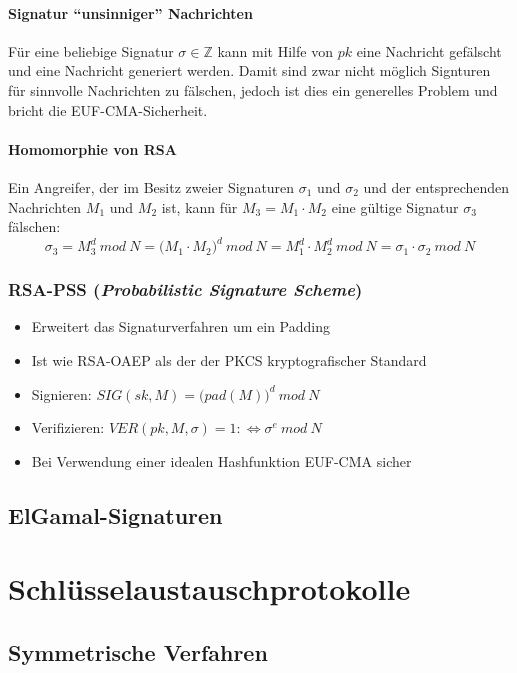 \paragraph{Signatur "`unsinniger"' Nachrichten}
Für eine beliebige Signatur \(\sigma \in \mathbb{Z}\) kann mit Hilfe von \(pk\) eine Nachricht gefälscht und eine Nachricht generiert werden. Damit sind zwar nicht möglich Signturen für sinnvolle Nachrichten zu fälschen, jedoch ist dies ein generelles Problem und bricht die EUF-CMA-Sicherheit.

\paragraph{Homomorphie von RSA}
Ein Angreifer, der im Besitz zweier Signaturen \(\sigma_1\) und \(\sigma_2\) und der entsprechenden Nachrichten \(M_1\) und \(M_2\) ist, kann für \(M_3 = M_1 \cdot M_2\) eine gültige Signatur \(\sigma_3\) fälschen:
\[\sigma_3 = M^d_3~mod~N = \big(M_1 \cdot M_2\big)^d~mod~N = M_1^d \cdot M_2^d~mod~N = \sigma_1 \cdot \sigma_2~mod~N\]

\subsubsection{RSA-PSS (\textit{Probabilistic Signature Scheme})}
\begin{itemize}
	\item Erweitert das Signaturverfahren um ein Padding
	\item Ist wie RSA-OAEP als der der PKCS kryptografischer Standard
	\item Signieren: \(SIG(sk,M) = \big(pad(M)\big)^d~mod~N\)
	\item Verifizieren: \(VER(pk,M,\sigma)=1 :\Leftrightarrow \sigma^e~mod~N\)
	\item Bei Verwendung einer idealen Hashfunktion EUF-CMA sicher
\end{itemize}


\subsection{ElGamal-Signaturen}



\section{Schlüsselaustauschprotokolle}

\subsection{Symmetrische Verfahren}



